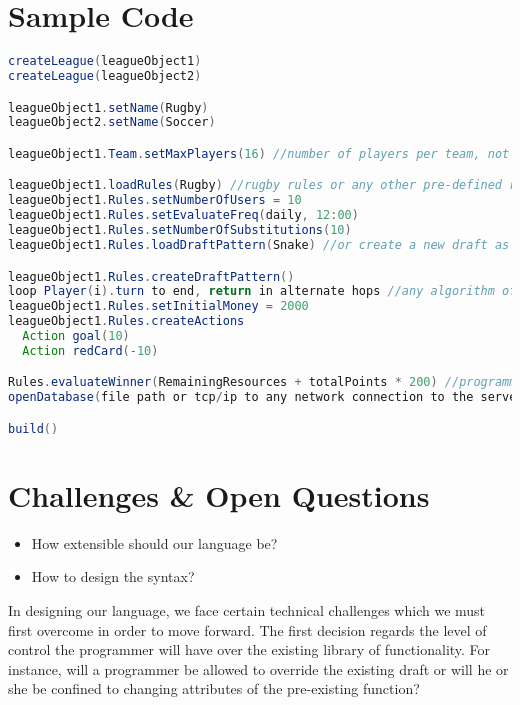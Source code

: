 \documentclass[12pt]{article}
\begin{document}
\section{Sample Code}

\begin{singlespace}
\begin{lstlisting}[language=Java,label=some-code,caption=FLOOD sample code]
createLeague(leagueObject1)
createLeague(leagueObject2)

leagueObject1.setName(Rugby)
leagueObject2.setName(Soccer)

leagueObject1.Team.setMaxPlayers(16) //number of players per team, not the number of users

leagueObject1.loadRules(Rugby) //rugby rules or any other pre-defined rules
leagueObject1.Rules.setNumberOfUsers = 10
leagueObject1.Rules.setEvaluateFreq(daily, 12:00) 
leagueObject1.Rules.setNumberOfSubstitutions(10)
leagueObject1.Rules.loadDraftPattern(Snake) //or create a new draft as follows 

leagueObject1.Rules.createDraftPattern()
loop Player(i).turn to end, return in alternate hops //any algorithm of the programmer's choice
leagueObject1.Rules.setInitialMoney = 2000 
leagueObject1.Rules.createActions
  Action goal(10)
  Action redCard(-10)

Rules.evaluateWinner(RemainingResources + totalPoints * 200) //programmer determines what formula is be used 
openDatabase(file path or tcp/ip to any network connection to the server)

build()
\end{lstlisting}
\end{singlespace}

\section{Challenges \& Open Questions}

\begin{itemize}
\item How extensible should our language be?
\item How to design the syntax?
\end{itemize}
In designing our language, we face certain technical challenges which we must first overcome in order to move forward. The first decision regards the level of control the programmer will have over the existing library of functionality. For instance, will a programmer be allowed to override the existing draft or will he or she be confined to changing attributes of the pre-existing function?
\end{document}
